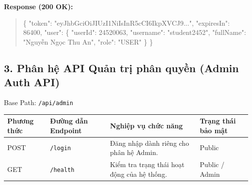 \documentclass[12pt,a4paper]{article}
\renewcommand{\_}{\BreakableUnderscore}
\newenvironment{Shaded}{\vspace{3pt}\begin{quote}}{\end{quote}\vspace{3pt}}
\newcommand{\DataTypeTok}[1]{\textcolor[rgb]{0.56,0.13,0.00}{#1}}
\newcommand{\DecValTok}[1]{\textcolor[rgb]{0.25,0.63,0.44}{#1}}
\newcommand{\FunctionTok}[1]{\textcolor[rgb]{0.02,0.16,0.49}{#1}}
\newcommand{\StringTok}[1]{\textcolor[rgb]{0.25,0.44,0.63}{#1}}
\begin{document}
\textbf{Response (200 OK):}

\begin{Shaded}
\begin{Highlighting}[]
\FunctionTok{\{}
  \DataTypeTok{"token"}\FunctionTok{:} \StringTok{"eyJhbGciOiJIUzI1NiIsInR5cCI6IkpXVCJ9..."}\FunctionTok{,}
  \DataTypeTok{"expiresIn"}\FunctionTok{:} \DecValTok{86400}\FunctionTok{,}
  \DataTypeTok{"user"}\FunctionTok{:} \FunctionTok{\{}
    \DataTypeTok{"userId"}\FunctionTok{:} \DecValTok{24520063}\FunctionTok{,}
    \DataTypeTok{"username"}\FunctionTok{:} \StringTok{"student2452"}\FunctionTok{,}
    \DataTypeTok{"fullName"}\FunctionTok{:} \StringTok{"Nguyễn Ngọc Thu An"}\FunctionTok{,}
    \DataTypeTok{"role"}\FunctionTok{:} \StringTok{"USER"}
  \FunctionTok{\}}
\FunctionTok{\}}
\end{Highlighting}
\end{Shaded}

\subsection{3. Phân hệ API Quản trị phân quyền (Admin Auth API)}

Base Path: \texttt{/api/admin}

\begin{longtable}[]{
  |>{\raggedright\arraybackslash}p{}
  |>{\raggedright\arraybackslash}p{}
  |>{\raggedright\arraybackslash}p{}
  |>{\raggedright\arraybackslash}p{}|}
\hline\rowcolor{tableHeader}
\begin{minipage}[b]{\linewidth}\raggedright
Phương thức
\end{minipage} & \begin{minipage}[b]{\linewidth}\raggedright
Đường dẫn Endpoint
\end{minipage} & \begin{minipage}[b]{\linewidth}\raggedright
Nghiệp vụ chức năng
\end{minipage} & \begin{minipage}[b]{\linewidth}\raggedright
Trạng thái bảo mật
\end{minipage} \\
\hline
\endhead
\hline
\endlastfoot
POST & \texttt{/login} & Đăng nhập dành riêng cho phân hệ Admin. & Public \\
\hline
GET & \texttt{/health} & Kiểm tra trạng thái hoạt động của hệ thống. & Public / Admin \\
\hline
\end{longtable}
\end{document}
